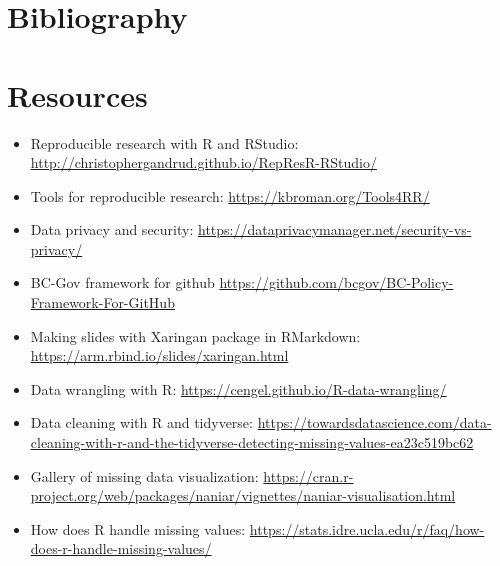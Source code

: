 \documentclass[]{book}
\providecommand{\tightlist}{%
  \setlength{\itemsep}{0pt}\setlength{\parskip}{0pt}}
\begin{document}
\hypertarget{bibliography}{%
\chapter{Bibliography}\label{bibliography}}

\hypertarget{resources}{%
\chapter{Resources}\label{resources}}

\begin{itemize}
\tightlist
\item
  Reproducible research with R and RStudio: \url{http://christophergandrud.github.io/RepResR-RStudio/}
\item
  Tools for reproducible research: \url{https://kbroman.org/Tools4RR/}
\item
  Data privacy and security: \url{https://dataprivacymanager.net/security-vs-privacy/}
\item
  BC-Gov framework for github \url{https://github.com/bcgov/BC-Policy-Framework-For-GitHub}
\item
  Making slides with Xaringan package in RMarkdown: \url{https://arm.rbind.io/slides/xaringan.html}
\item
  Data wrangling with R: \url{https://cengel.github.io/R-data-wrangling/}
\item
  Data cleaning with R and tidyverse: \url{https://towardsdatascience.com/data-cleaning-with-r-and-the-tidyverse-detecting-missing-values-ea23c519bc62}
\item
  Gallery of missing data visualization: \url{https://cran.r-project.org/web/packages/naniar/vignettes/naniar-visualisation.html}
\item
  How does R handle missing values: \url{https://stats.idre.ucla.edu/r/faq/how-does-r-handle-missing-values/}
\end{itemize}
\end{document}
